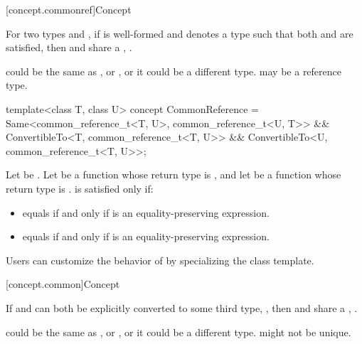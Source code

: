 [concept.commonref]{Concept }

\pnum
For two types  and , if 
is well-formed and denotes a type  such that both
and
are satisfied, then  and  share a
, .
\begin{note}
 could be the same as , or , or it could be a
different type.  may be a reference type.
\end{note}

%
\begin{itemdecl}
template<class T, class U>
  concept CommonReference =
    Same<common_reference_t<T, U>, common_reference_t<U, T>> &&
    ConvertibleTo<T, common_reference_t<T, U>> &&
    ConvertibleTo<U, common_reference_t<T, U>>;
\end{itemdecl}

\begin{itemdescr}
\pnum
Let  be . Let  be a
function whose return type is , and let  be a function
whose return type is .  is
satisfied only if:
\begin{itemize}
\item {} equals  if and only if  is an
  equality-preserving expression.
\item {} equals  if and only if  is an
  equality-preserving expression.
\end{itemize}

\pnum
\begin{note}
Users can customize the behavior of  by specializing
the  class template.
\end{note}
\end{itemdescr}

[concept.common]{Concept }

\pnum
If  and  can both be explicitly converted to some third type,
, then  and  share a ,
.
\begin{note}
 could be the same as , or , or it could be a
different type.  might not be unique.
\end{note}

